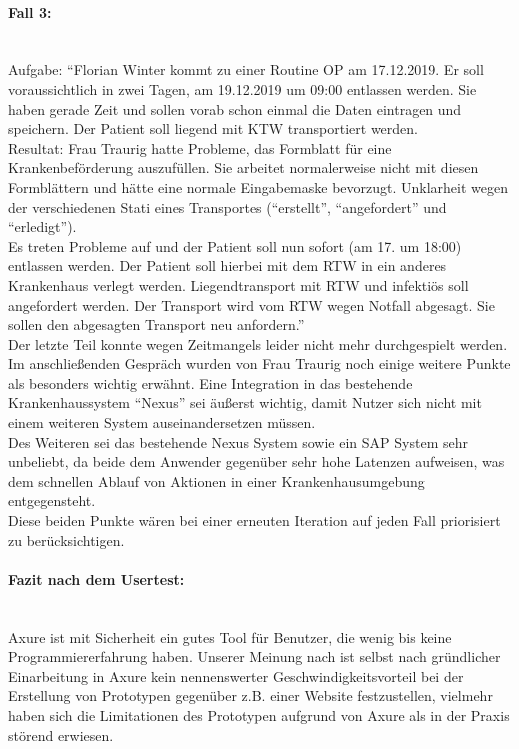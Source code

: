 \documentclass[a4paper, ngerman, 12pt]{scrartcl}
\begin{document}
\paragraph{Fall 3:}\leavevmode\\
Aufgabe: “Florian Winter kommt zu einer Routine OP am 17.12.2019. Er soll voraussichtlich in zwei Tagen, am 19.12.2019 um 09:00 entlassen werden. Sie haben gerade Zeit und sollen vorab schon einmal die Daten eintragen und speichern. Der Patient soll liegend mit KTW transportiert werden.\\
 
Resultat: Frau Traurig hatte Probleme, das Formblatt für eine Krankenbeförderung auszufüllen. Sie arbeitet normalerweise nicht mit diesen Formblättern und hätte eine normale Eingabemaske bevorzugt. Unklarheit wegen der verschiedenen Stati eines Transportes (“erstellt”, “angefordert” und “erledigt”).\\
 
Es treten Probleme auf und der Patient soll nun sofort (am 17. um 18:00) entlassen werden. Der Patient soll hierbei mit dem RTW in ein anderes Krankenhaus verlegt werden. Liegendtransport mit RTW und infektiös soll angefordert werden. Der Transport wird vom RTW wegen Notfall abgesagt. Sie sollen den abgesagten Transport neu anfordern.”\\
 
Der letzte Teil konnte wegen Zeitmangels leider nicht mehr durchgespielt werden.\\
 
Im anschließenden Gespräch wurden von Frau Traurig noch einige weitere Punkte als besonders wichtig erwähnt. Eine Integration in das bestehende Krankenhaussystem “Nexus” sei äußerst wichtig, damit Nutzer sich nicht mit einem weiteren System auseinandersetzen müssen.\\

Des Weiteren sei das bestehende Nexus System sowie ein SAP System sehr unbeliebt, da beide dem Anwender gegenüber sehr hohe Latenzen aufweisen, was dem schnellen Ablauf von Aktionen in einer Krankenhausumgebung entgegensteht.\\
 
Diese beiden Punkte wären bei einer erneuten Iteration auf jeden Fall priorisiert zu berücksichtigen.

\paragraph{Fazit nach dem Usertest:}\leavevmode\\
Axure ist mit Sicherheit ein gutes Tool für Benutzer, die wenig bis keine Programmiererfahrung haben. Unserer Meinung nach ist selbst nach gründlicher Einarbeitung in Axure kein nennenswerter Geschwindigkeitsvorteil bei der Erstellung von Prototypen gegenüber z.B. einer Website festzustellen, vielmehr haben sich die Limitationen des Prototypen aufgrund von Axure als in der Praxis störend erwiesen.\\
\end{document}
